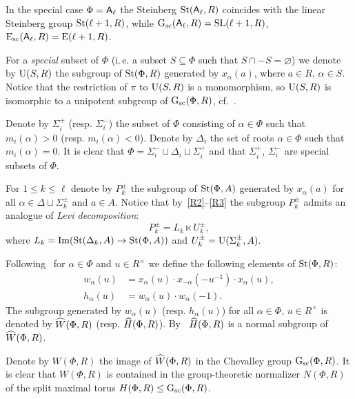 In the special case $\Phi =\mathsf{A}_\ell$ the Steinberg $\operatorname{St}(\mathsf{A}_\ell, R)$ coincides with the linear Steinberg group $\operatorname{St}(\ell + 1, R)$, while
  $\operatorname{G}_\mathrm{sc}(\mathsf{A}_\ell, R) = \mathrm{SL}(\ell + 1, R)$, $\operatorname{E}_\mathrm{sc}(\mathsf{A}_\ell, R) = \operatorname{E}(\ell + 1, R)$.

For a \textit{special} subset of $\Phi$ (i.\,e. a subset $S \subseteq \Phi$ such that $S \cap -S = \varnothing$)
we denote by $\operatorname{U}(S, R)$ the subgroup of $\operatorname{St}(\Phi, R)$ generated by $x_\alpha(a)$, where $a \in R$, $\alpha \in S$.
Notice that the restriction of $\pi$ to $\operatorname{U}(S, R)$ is a monomorphism, so $\operatorname{U}(S, R)$ is isomorphic to a unipotent subgroup of $\operatorname{G}_\mathrm{sc}(\Phi, R)$, cf.~\cite[\S~1A]{St78}.

Denote by $\Sigma^+_i$ (resp. $\Sigma^-_i$) the subset of $\Phi$ consisting of $\alpha \in \Phi$ such that $m_i(\alpha) > 0$ (resp. $m_i(\alpha) < 0$).
Denote by $\Delta_i$ the set of roots $\alpha \in \Phi$ such that $m_i(\alpha) = 0$.
It is clear that $\Phi = \Sigma_i^- \sqcup \Delta_i \sqcup \Sigma_i^+$ and that $\Sigma_i^+$, $\Sigma_i^-$ are special subsets of $\Phi$.

For $1 \leq k \leq \ell$ denote by $P_k^\pm$ the subgroup of $\operatorname{St}(\Phi, A)$ generated by $x_\alpha(a)$ for all $\alpha \in \Delta \sqcup \Sigma^\pm_k$ and $a \in A$.
Notice that by~\eqref{R2}--\eqref{R3} the subgroup $P_k^\pm$ admits an analogue of \textit{Levi decomposition}:
\begin{equation} \label{eq:levi-decomp} P_k^\pm = L_k \ltimes U_k^\pm, \end{equation}
where $L_k = \mathrm{Im}(\operatorname{St}(\Delta_k, A) \to \operatorname{St}(\Phi, A))$ and $U_k^\pm = \operatorname{U}(\Sigma_k^\pm, A).$

Following~\cite{Ma69} for $\alpha\in\Phi$ and $u \in R^\times$ we define the following elements of $\operatorname{St}(\Phi, R)$:
\begin{align} w_\alpha(u) & =  x_\alpha(u) \cdot x_{-\alpha}(-u^{-1}) \cdot x_\alpha(u), \label{eq:w-definition} \\
               h_\alpha(u) & =  w_\alpha(u) \cdot w_\alpha(-1).  \label{eq:h-definition} \end{align}
The subgroup generated by $w_\alpha(u)$ (resp. $h_\alpha(u)$) for all $\alpha\in \Phi$, $u \in R^\times$ is denoted by $\widehat{W}(\Phi, R)$ (resp. $\widehat{H}(\Phi, R)$).
By~\cite[Lemme~5.2]{Ma69} $\widehat{H}(\Phi, R)$ is a normal subgroup of $\widehat{W}(\Phi, R)$.

Denote by $W(\Phi, R)$ the image of $\widehat{W}(\Phi, R)$ in the Chevalley group $\operatorname{G}_\mathrm{sc}(\Phi, R)$.
It is clear that $W(\Phi, R)$ is contained in the group-theoretic normalizer $N(\Phi, R)$ of the split maximal torus $H(\Phi, R) \leq \operatorname{G}_\mathrm{sc}(\Phi, R)$.


